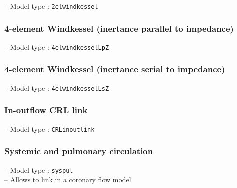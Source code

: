 \documentclass[a4paper,12pt]{report}
\begin{document}
-- Model type : \verb"2elwindkessel"\\

\subsubsection{4-element Windkessel (inertance parallel to impedance)}

-- Model type : \verb"4elwindkesselLpZ"\\

\subsubsection{4-element Windkessel (inertance serial to impedance)}

-- Model type : \verb"4elwindkesselLsZ"\\

\subsubsection{In-outflow CRL link}

-- Model type : \verb"CRLinoutlink"\\

\subsubsection{Systemic and pulmonary circulation}

-- Model type : \verb"syspul"\\

-- Allows to link in a coronary flow model
\end{document}
